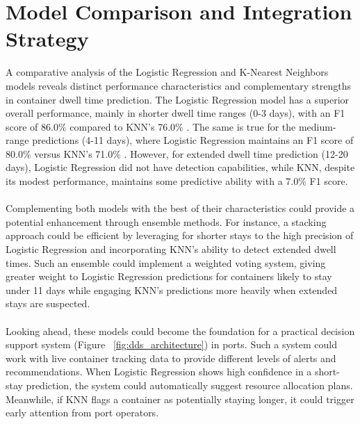 	\section{Model Comparison and Integration Strategy}

		A comparative analysis of the Logistic Regression and K-Nearest Neighbors models reveals distinct performance
		characteristics and complementary strengths in container dwell time prediction. The Logistic Regression model
		has a superior overall performance, mainly in shorter dwell time ranges (0-3 days), with an F1 score of 86.0\%
		compared to KNN's 76.0\%
		. The same is true for the medium-range predictions (4-11 days), where Logistic Regression maintains an
		F1 score of 80.0\% versus KNN's 71.0\%
		. However, for extended dwell time prediction (12-20 days), Logistic Regression did not have detection
		capabilities, while KNN, despite its modest performance, maintains some predictive ability with a 7.0\%
		F1 score.
		\\
		\\
		Complementing both models with the best of their characteristics could provide a potential enhancement through
		ensemble methods. For instance, a stacking approach could be efficient by leveraging for shorter stays to the
		high precision of Logistic Regression and incorporating KNN's ability to detect extended dwell times. Such an
		ensemble could implement a weighted voting system, giving greater weight to Logistic Regression predictions for
		containers likely to stay under 11 days while engaging KNN's predictions more heavily when extended stays are
		suspected.
		\\
		\\
		Looking ahead, these models could become the foundation for a practical decision support system (Figure~
		\ref{fig:dds_architecture}) in ports.
		Such a system could work with live container tracking data to provide different levels of alerts and
		recommendations. When Logistic Regression shows high confidence in a short-stay prediction, the system could
		automatically suggest resource allocation plans. Meanwhile, if KNN flags a container as potentially staying
		longer, it could trigger early attention from port operators.